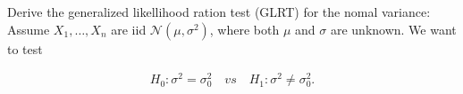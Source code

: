 
\begin{exercise}

Derive the generalized likellihood ration test (GLRT) for the nomal variance:
Assume $X_1, \dots, X_n$ are iid $\mathcal N(\mu, \sigma^2)$, where both $\mu$ and $\sigma$ are unknown.
We want to test

\begin{align*}
    H_0: \sigma^2 = \sigma_0^2
    \quad
    \textit{vs}
    \quad
    H_1: \sigma^2 \neq \sigma_0^2.
\end{align*}

\end{exercise}


\begin{solution}

\phantom{}

\end{solution}

